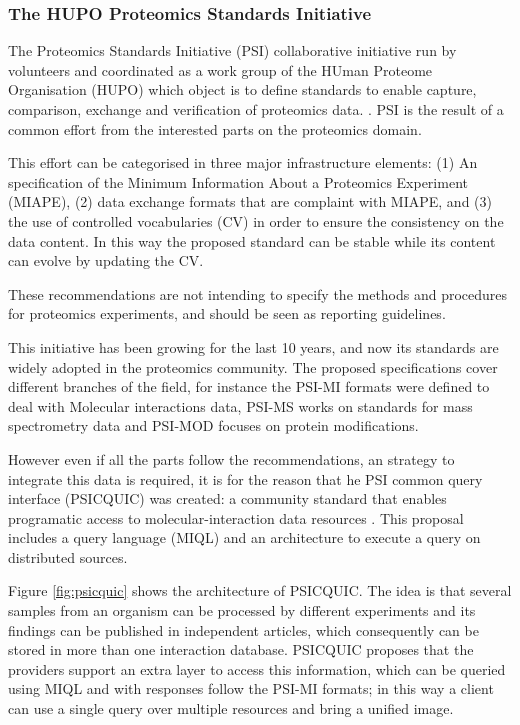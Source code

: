 \subsubsection{The HUPO Proteomics Standards Initiative}
The Proteomics Standards Initiative (PSI) collaborative initiative run by volunteers and coordinated as a work group of the HUman Proteome Organisation (HUPO) which object is to define standards  to enable capture, comparison, exchange and verification of proteomics data. \cite{HER2006}. PSI is the result of a common effort from the interested parts on the proteomics domain.

This effort can be categorised in three major infrastructure elements: (1) An specification of the Minimum Information About a Proteomics Experiment (MIAPE), (2) data exchange formats that are complaint with MIAPE, and (3) the use of controlled vocabularies (CV) in order to ensure the consistency on the data content. In this way the proposed standard can be stable while its content can evolve by updating the CV.

These recommendations are not intending to specify the methods and procedures for proteomics experiments, and should be seen as reporting guidelines.

This initiative has been growing for the last 10 years, and now its standards are widely adopted in the proteomics community. The proposed specifications cover different branches of the field, for instance the PSI-MI formats were defined to deal with Molecular interactions data, PSI-MS works on standards for mass spectrometry data and PSI-MOD focuses on protein modifications.

However even if all the parts follow the recommendations, an strategy to integrate this data is required, it is for the reason that he PSI common query interface (PSICQUIC) was created: a community standard that enables programatic access to molecular-interaction data resources \cite{ARA2011}. This proposal includes a query language (MIQL) and an architecture to execute a query on distributed sources.

Figure \ref{fig:psicquic} shows the architecture of PSICQUIC. The idea is that several samples from an organism can be processed by different experiments and its findings can be published in independent articles, which consequently can be stored in more than one interaction database. PSICQUIC proposes that the providers support an extra layer to access this information, which can be queried using MIQL and with responses follow the PSI-MI formats; in this way a client can use a single query over multiple resources and bring a unified image.


